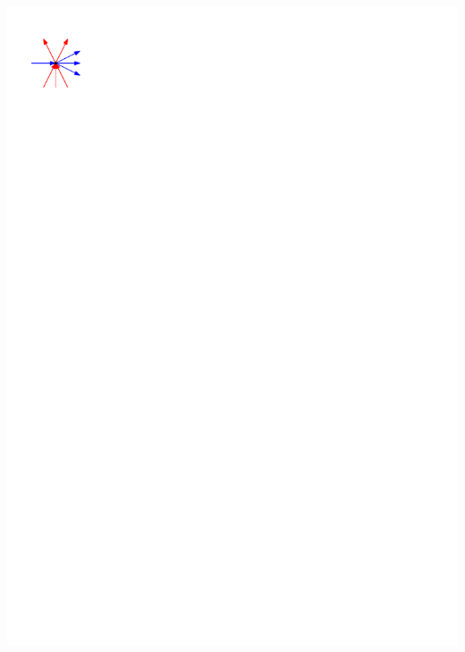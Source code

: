 \documentclass[a4paper]{article}
\begin{document}
\includegraphics[width = \textwidth]{./rectangularDuals/img/interiorcondition.pdf}
\clearpage%
\end{document}

